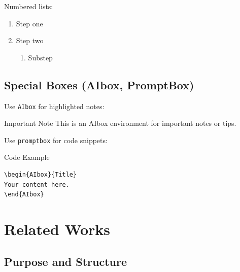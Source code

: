 \documentclass[]{fairmeta} %
\theoremstyle{plain}
\theoremstyle{definition}
\theoremstyle{remark}
\begin{document}
Numbered lists:

\begin{enumerate}
  \item Step one
  \item Step two
    \begin{enumerate}
      \item Substep
    \end{enumerate}
\end{enumerate}


\subsection{Special Boxes (AIbox, PromptBox)}
\label{sec:boxes}

Use \texttt{AIbox} for highlighted notes:

\begin{AIbox}{Important Note}
This is an AIbox environment for important notes or tips.
\end{AIbox}

Use \texttt{promptbox} for code snippets:

\begin{promptbox}{Code Example}
\begin{verbatim}
\begin{AIbox}{Title}
Your content here.
\end{AIbox}
\end{verbatim}
\end{promptbox}


\section{Related Works}
\label{sec:related}


\subsection{Purpose and Structure}
\label{sec:rw-purpose}
\end{document}
